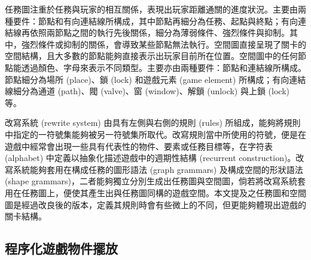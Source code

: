 任務圖注重於任務與玩家的相互關係，表現出玩家距離通關的進度狀況。主要由兩種要件：節點和有向連結線所構成，其中節點再細分為任務、起點與終點；有向連結線再依照兩節點之間的執行先後關係，細分為薄弱條件、強烈條件與抑制。其中，強烈條件或抑制的關係，會導致某些節點無法執行。空間圖直接呈現了關卡的空間結構，且大多數的節點能夠直接表示出玩家目前所在位置。空間圖中的任何節點能透過顏色、字母來表示不同類型。主要亦由兩種要件：節點和連結線所構成。節點細分為場所 (place)、鎖 (lock) 和遊戲元素 (game element) 所構成；有向連結線細分為通道 (path)、閥 (valve)、窗 (window)、解鎖 (unlock) 與上鎖 (lock) 等。

改寫系統 (rewrite system) 由具有左側與右側的規則 (rules) 所組成，能夠將規則中指定的一符號集能夠被另一符號集所取代。改寫規則當中所使用的符號，便是在遊戲中經常會出現一些具有代表性的物件、要素或任務目標等，在字符表 (alphabet) 中定義以抽象化描述遊戲中的週期性結構 (recurrent construction)。改寫系統能夠套用在構成任務的圖形語法 (graph grammars) 及構成空間的形狀語法 (shape grammars)，二者能夠獨立分別生成出任務圖與空間圖，倘若將改寫系統套用在任務圖上，便使其產生出與任務圖同構的遊戲空間。本文提及之任務圖和空間圖是經過改良後的版本，定義其規則時會有些微上的不同，但更能夠體現出遊戲的關卡結構。





\subsection{程序化遊戲物件擺放}
\label{ssec:relatedworks-proceduralgamepatterns}

